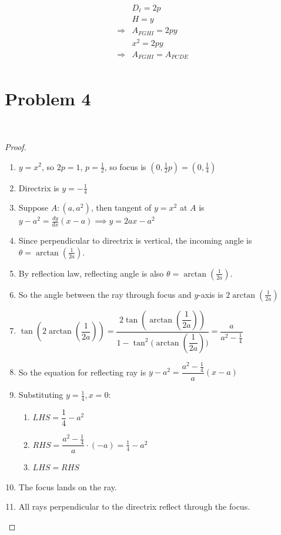 \documentclass{article}
\begin{document}
~

\begin{align*}
    &D_\ell=2p\\
    &H=y\\
    \Rightarrow&A_{FGHI}=2py\\
    &x^2=2py\\
    \Rightarrow&A_{FGHI}=A_{PCDE}\\
\end{align*}

\newpage

\section*{Problem 4}

~

\begin{proof}
    ~
    \begin{enumerate}
        \item $y=x^2$, so $2p=1$, $p=\frac{1}{2}$, so focus is $(0,\frac{1}{2}p)=(0,\frac{1}{4})$
        \item Directrix is $y=-\frac{1}{4}$\\
        \item Suppose $A:(a,a^2)$, then tangent of $y=x^2$ at $A$ is $y-a^2=\frac{dy}{dx}(x-a)\implies y=2ax-a^2$
        \item Since perpendicular to directrix is vertical, the incoming angle is $\theta=\arctan(\frac{1}{2a})$.
        \item By reflection law, reflecting angle is also $\theta=\arctan(\frac{1}{2a})$.
        \item So the angle between the ray through focus and $y$-axis is $2\arctan(\frac{1}{2a})$
        \item $\tan(2\arctan(\dfrac{1}{2a}))=\dfrac{2\tan(\arctan(\dfrac{1}{2a}))}{1-{\tan^2(\arctan(\dfrac{1}{2a})})}=\dfrac{a}{a^2-\frac{1}{4}}$
        \item So the equation for reflecting ray is $y-a^2=\dfrac{a^2-\frac{1}{4}}{a}(x-a)$
        \item Substituting $y=\frac{1}{4},x=0$:
            \begin{enumerate}
                \item $LHS=\dfrac{1}{4}-a^2$
                \item $RHS=\dfrac{a^2-\frac{1}{4}}{a}\cdot (-a)=\frac{1}{4}-a^2$
                \item $LHS=RHS$
            \end{enumerate}
        \item The focus lands on the ray.
        \item All rays perpendicular to the directrix reflect through the focus.
    \end{enumerate}
\end{proof}
\end{document}
